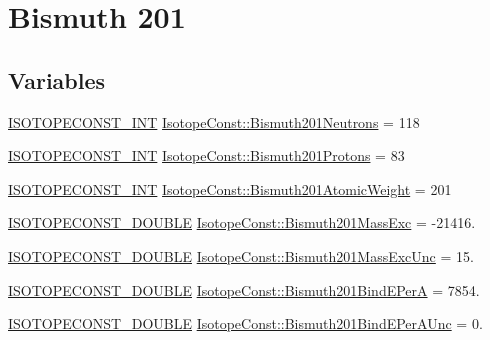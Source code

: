 \hypertarget{group___isotope_const-_bismuth-_bi201}{}\section{Bismuth 201}
\label{group___isotope_const-_bismuth-_bi201}
\subsection*{Variables}
\begin{DoxyCompactItemize}
\item 
\mbox{\hyperlink{group___isotope_const-_macros_ga5f18360b3e99483a35c32d789e62621c}{I\+S\+O\+T\+O\+P\+E\+C\+O\+N\+S\+T\+\_\+\+I\+NT}} \mbox{\hyperlink{group___isotope_const-_bismuth-_bi201_ga2077a6b69a87870c0e15765c8cadd78f}{Isotope\+Const\+::\+Bismuth201\+Neutrons}} = 118
\item 
\mbox{\hyperlink{group___isotope_const-_macros_ga5f18360b3e99483a35c32d789e62621c}{I\+S\+O\+T\+O\+P\+E\+C\+O\+N\+S\+T\+\_\+\+I\+NT}} \mbox{\hyperlink{group___isotope_const-_bismuth-_bi201_ga7efcd17c4d423a66e1bc256293ab3020}{Isotope\+Const\+::\+Bismuth201\+Protons}} = 83
\item 
\mbox{\hyperlink{group___isotope_const-_macros_ga5f18360b3e99483a35c32d789e62621c}{I\+S\+O\+T\+O\+P\+E\+C\+O\+N\+S\+T\+\_\+\+I\+NT}} \mbox{\hyperlink{group___isotope_const-_bismuth-_bi201_gaa75a242c798cd4907c955d75997a11be}{Isotope\+Const\+::\+Bismuth201\+Atomic\+Weight}} = 201
\item 
\mbox{\hyperlink{group___isotope_const-_macros_ga8f45a7272ce02c0b4c65c44636ed719a}{I\+S\+O\+T\+O\+P\+E\+C\+O\+N\+S\+T\+\_\+\+D\+O\+U\+B\+LE}} \mbox{\hyperlink{group___isotope_const-_bismuth-_bi201_ga3e7786e6869c7cffd8593a40972770bf}{Isotope\+Const\+::\+Bismuth201\+Mass\+Exc}} = -\/21416.
\item 
\mbox{\hyperlink{group___isotope_const-_macros_ga8f45a7272ce02c0b4c65c44636ed719a}{I\+S\+O\+T\+O\+P\+E\+C\+O\+N\+S\+T\+\_\+\+D\+O\+U\+B\+LE}} \mbox{\hyperlink{group___isotope_const-_bismuth-_bi201_gac57401a15533233cfdbdc5347ec865dd}{Isotope\+Const\+::\+Bismuth201\+Mass\+Exc\+Unc}} = 15.
\item 
\mbox{\hyperlink{group___isotope_const-_macros_ga8f45a7272ce02c0b4c65c44636ed719a}{I\+S\+O\+T\+O\+P\+E\+C\+O\+N\+S\+T\+\_\+\+D\+O\+U\+B\+LE}} \mbox{\hyperlink{group___isotope_const-_bismuth-_bi201_gaad6e0513a42748433be45f39c65b02ad}{Isotope\+Const\+::\+Bismuth201\+Bind\+E\+PerA}} = 7854.
\item 
\mbox{\hyperlink{group___isotope_const-_macros_ga8f45a7272ce02c0b4c65c44636ed719a}{I\+S\+O\+T\+O\+P\+E\+C\+O\+N\+S\+T\+\_\+\+D\+O\+U\+B\+LE}} \mbox{\hyperlink{group___isotope_const-_bismuth-_bi201_ga219e008c6f756d74264f4da3d293321c}{Isotope\+Const\+::\+Bismuth201\+Bind\+E\+Per\+A\+Unc}} = 0.

\end{DoxyCompactItemize}
